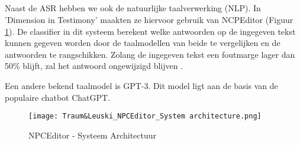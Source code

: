 \subsection{}%

Naast de ASR hebben we ook de natuurlijke taalverwerking (NLP). In 'Dimension in Testimony' maakten ze hiervoor gebruik van NCPEditor (Figuur \ref{fig:NPCEArchitecture}). De classifier in dit systeem berekent welke antwoorden op de ingegeven tekst kunnen gegeven worden door de taalmodellen van beide te vergelijken en de antwoorden te rangschikken. Zolang de ingegeven tekst een foutmarge lager dan 50\% blijft, zal het antwoord ongewijzigd blijven \autocite{Leuski2010}.

Een andere bekend taalmodel is GPT-3. Dit model ligt aan de basis van de populaire chatbot ChatGPT.

\begin{figure}[h]
    \centering
    \texttt{[image: Traum\&Leuski\_NPCEditor\_System architecture.png]}
    \caption{NPCEditor - Systeem Architectuur \autocite{Leuski2010}}
    \label{fig:NPCEArchitecture}
\end{figure}

%
%
%

